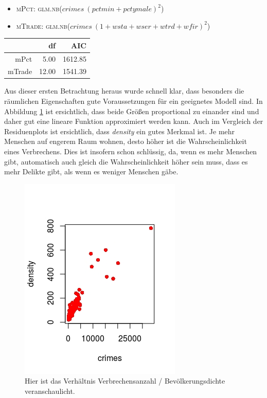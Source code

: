 \begin{itemize}
\item \textsc{mPct: glm.nb($crimes~(pctmin+pctymale)^2$)}
\item \textsc{mTrade: glm.nb($crimes~(1+wsta+wser+wtrd+wfir)^2$)}
\label{lis:pct}
\end{itemize}

\begin{table}[ht]
\centering
\begin{tabular}{rrr}
  \hline
 & df & AIC \\ 
  \hline
mPct & 5.00 & 1612.85 \\ 
  mTrade & 12.00 & 1541.39 \\ 
   \hline
\end{tabular}
\label{tab:pct}
\end{table}

\par\smallskip
Aus dieser ersten Betrachtung heraus wurde schnell klar, dass besonders die r\"aumlichen Eigenschaften gute Voraussetzungen f\"ur ein geeignetes Modell sind.
In Abbildung \ref{fig:dcc} ist ersichtlich, dass beide Gr\"o\ss{}en proportional zu einander sind und daher gut eine lineare Funktion approximiert werden kann.
Auch im Vergleich der Residuenplots ist ersichtlich, dass \textit{density} ein gutes Merkmal ist.
Je mehr Menschen auf engerem Raum wohnen, desto h\"oher ist die Wahrscheinlichkeit eines Verbrechens.
Dies ist insofern schon schl\"ussig, da, wenn es mehr Menschen gibt, automatisch auch gleich die Wahrscheinlichkeit h\"oher sein muss, dass es mehr Delikte gibt, als wenn es weniger Menschen g\"abe.

\begin{figure}
\centering
\includegraphics[scale=0.7]{./jpgs/dcc.jpeg}
\caption{Hier ist das Verh\"altnis Verbrechensanzahl / Bev\"olkerungsdichte veranschaulicht.}
\label{fig:dcc}
\end{figure}

